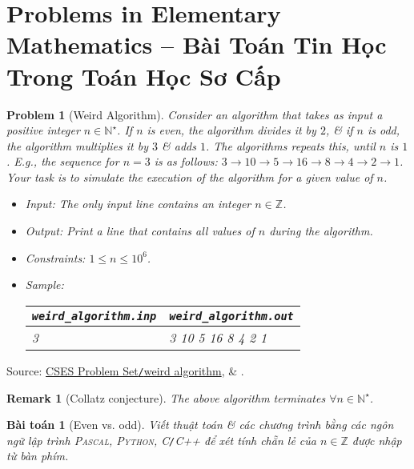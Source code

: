 \documentclass{article}
\newtheorem{baitoan}{Bài toán}
\newtheorem{problem}{Problem}
\newtheorem{remark}{Remark}
\begin{document}

\section{Problems in Elementary Mathematics  -- Bài Toán Tin Học Trong Toán Học Sơ Cấp}

\begin{problem}[Weird Algorithm]
	Consider an algorithm that takes as input a positive integer $n\in\mathbb{N}^\star$. If $n$ is even, the algorithm divides it by $2$, \& if $n$ is odd, the algorithm multiplies it by $3$ \& adds $1$. The algorithms repeats this, until $n$ is $1$. E.g., the sequence for $n = 3$ is as follows: $3\to10\to5\to16\to8\to4\to2\to1$. Your task is to simulate the execution of the algorithm for a given value of $n$.
	\begin{itemize}
		\item {\sf Input:} The only input line contains an integer $n\in\mathbb{Z}$.
		\item {\sf Output:} Print a line that contains all values of $n$ during the algorithm.
		\item {\sf Constraints:} $1\le n\le10^6$.
		\item {\sf Sample:}
		\begin{table}[H]
			\centering
			\begin{tabular}{|l|l|}
				\hline
				\verb|weird_algorithm.inp| & \verb|weird_algorithm.out| \\
				\hline
				3 & 3 10 5 16 8 4 2 1 \\
				\hline
			\end{tabular}
		\end{table}
	\end{itemize}
\end{problem}
Source: \href{https://cses.fi/problemset/task/1068}{CSES Problem Set\texttt{/}weird algorithm}, \& \cite[Sect. 1.3, pp. 5--7]{Laaksonen2020}.

\begin{remark}[Collatz conjecture]
	The above algorithm terminates $\forall n\in\mathbb{N}^\star$.
\end{remark}

\begin{baitoan}[Even vs. odd]
	Viết thuật toán \& các chương trình bằng các ngôn ngữ lập trình \textsc{Pascal, Python, C\texttt{/}C++} để xét tính chẵn lẻ của $n\in\mathbb{Z}$ được nhập từ bàn phím.
\end{baitoan}
\end{document}
